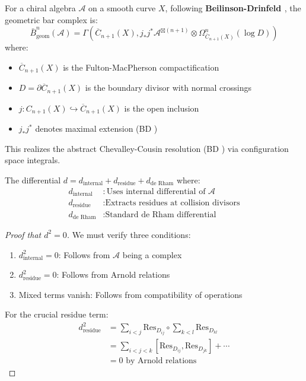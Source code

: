 \begin{definition}\label{def:geometric-bar}
For a chiral algebra $\mathcal{A}$ on a smooth curve $X$, following 
\textbf{Beilinson-Drinfeld \cite[Theorem 3.4.9]{BD04}}, 
the geometric bar complex is:
$$\bar{B}_{\text{geom}}^n(\mathcal{A}) = \Gamma\left(\overline{C}_{n+1}(X), j_*j^*\mathcal{A}^{\boxtimes(n+1)} \otimes \Omega^n_{\overline{C}_{n+1}(X)}(\log D)\right)$$
where:
\begin{itemize}
\item $\overline{C}_{n+1}(X)$ is the Fulton-MacPherson compactification \cite{FM94}
\item $D = \partial \overline{C}_{n+1}(X)$ is the boundary divisor with normal crossings
\item $j: C_{n+1}(X) \hookrightarrow \overline{C}_{n+1}(X)$ is the open inclusion
\item $j_*j^*$ denotes maximal extension 
(BD \cite[§3.4.4, (3.4.4.2)]{BD04})
\end{itemize}

This realizes the abstract Chevalley-Cousin resolution 
(BD \cite[§3.4.10--3.4.12]{BD04}) via configuration space integrals.
\end{definition}

\begin{theorem}
The differential $d = d_{\text{internal}} + d_{\text{residue}} + d_{\text{de Rham}}$ where:
\begin{align}
d_{\text{internal}} &: \text{Uses internal differential of } \mathcal{A} \\
d_{\text{residue}} &: \text{Extracts residues at collision divisors} \\
d_{\text{de Rham}} &: \text{Standard de Rham differential}
\end{align}
\end{theorem}

\begin{proof}[Proof that $d^2 = 0$]
We must verify three conditions:
\begin{enumerate}
\item $d_{\text{internal}}^2 = 0$: Follows from $\mathcal{A}$ being a complex
\item $d_{\text{residue}}^2 = 0$: Follows from Arnold relations
\item Mixed terms vanish: Follows from compatibility of operations
\end{enumerate}

For the crucial residue term:
\begin{align}
d_{\text{residue}}^2 &= \sum_{i<j} \text{Res}_{D_{ij}} \circ \sum_{k<l} \text{Res}_{D_{kl}} \\
&= \sum_{i<j<k} [\text{Res}_{D_{ij}}, \text{Res}_{D_{jk}}] + \cdots \\
&= 0 \text{ by Arnold relations}
\end{align}
\end{proof}

